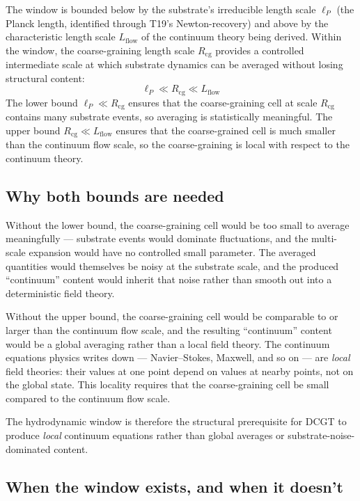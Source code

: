 \documentclass[11pt,a4paper]{article}
\begin{document}
The window is bounded below by the substrate's irreducible length scale $\ell_P$ (the Planck length, identified through T19's Newton-recovery) and above by the characteristic length scale $L_{\mathrm{flow}}$ of the continuum theory being derived. Within the window, the coarse-graining length scale $R_{\mathrm{cg}}$ provides a controlled intermediate scale at which substrate dynamics can be averaged without losing structural content:
\[
\ell_P \ll R_{\mathrm{cg}} \ll L_{\mathrm{flow}}
\]
The lower bound $\ell_P \ll R_{\mathrm{cg}}$ ensures that the coarse-graining cell at scale $R_{\mathrm{cg}}$ contains many substrate events, so averaging is statistically meaningful. The upper bound $R_{\mathrm{cg}} \ll L_{\mathrm{flow}}$ ensures that the coarse-grained cell is much smaller than the continuum flow scale, so the coarse-graining is local with respect to the continuum theory.

\subsection{Why both bounds are needed}

Without the lower bound, the coarse-graining cell would be too small to average meaningfully --- substrate events would dominate fluctuations, and the multi-scale expansion would have no controlled small parameter. The averaged quantities would themselves be noisy at the substrate scale, and the produced ``continuum'' content would inherit that noise rather than smooth out into a deterministic field theory.

Without the upper bound, the coarse-graining cell would be comparable to or larger than the continuum flow scale, and the resulting ``continuum'' content would be a global averaging rather than a local field theory. The continuum equations physics writes down --- Navier--Stokes, Maxwell, and so on --- are \emph{local} field theories: their values at one point depend on values at nearby points, not on the global state. This locality requires that the coarse-graining cell be small compared to the continuum flow scale.

The hydrodynamic window is therefore the structural prerequisite for DCGT to produce \emph{local} continuum equations rather than global averages or substrate-noise-dominated content.

\subsection{When the window exists, and when it doesn't}
\end{document}
